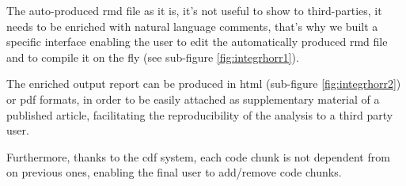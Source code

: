 The auto-produced \gls{rmd} file as it is, it's not useful to show to third-parties, it needs to be enriched with natural language comments,  that's why we built a specific interface enabling the user to edit the automatically produced \gls{rmd} file and to compile it on the fly (see sub-figure \ref{fig:integrhorr1}).

The enriched output report can be produced in \gls{html} (sub-figure \ref{fig:integrhorr2}) or \gls{pdf} formats, in order to be easily attached as supplementary material of a published article, facilitating the reproducibility of the analysis to a third party user.

Furthermore, thanks to the \gls{cdf} system, each code chunk is not dependent from on previous ones, enabling the final user to add/remove code chunks.